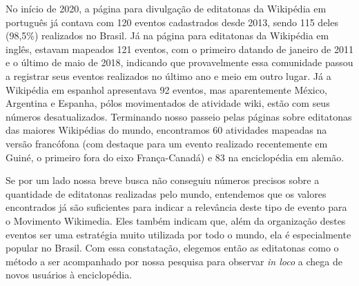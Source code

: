 No início de 2020, a página para divulgação de editatonas da Wikipédia em português já contava com 120 eventos cadastrados desde 2013, sendo 115 deles (98,5\%) realizados no Brasil. Já na página para editatonas da Wikipédia em inglês, estavam mapeados 121 eventos, com o primeiro datando de janeiro de 2011 e o último de maio de 2018, indicando que provavelmente essa comunidade passou a registrar seus eventos realizados no último ano e meio em outro lugar. Já a Wikipédia em espanhol apresentava 92 eventos, mas aparentemente México, Argentina e Espanha, pólos movimentados de atividade wiki, estão com seus números desatualizados. Terminando nosso passeio pelas páginas sobre editatonas das maiores Wikipédias do mundo, encontramos 60 atividades mapeadas na versão francófona (com destaque para um evento realizado recentemente em Guiné, o primeiro fora do eixo França-Canadá) e 83 na enciclopédia em alemão.

Se por um lado nossa breve busca não conseguiu números precisos sobre a quantidade de editatonas realizadas pelo mundo, entendemos que os valores encontrados já são suficientes para indicar a relevância deste tipo de evento para o Movimento Wikimedia. Eles também indicam que, além da organização destes eventos ser uma estratégia muito utilizada por todo o mundo, ela é especialmente popular no Brasil. Com essa constatação, elegemos então as editatonas como o método a ser acompanhado por nossa pesquisa para observar \textit{in loco} a chega de novos usuários à enciclopédia.
